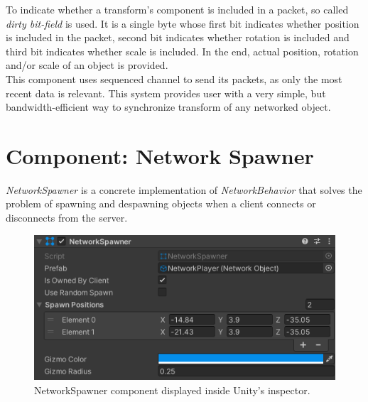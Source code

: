 \documentclass[times, utf8, diplomski]{fer}
\begin{document}
To indicate whether a transform's component is included in a packet, so called \textit{dirty bit-field} is used. It is a single byte whose first bit indicates whether position is included in the packet, second bit indicates whether rotation is included and third bit indicates whether scale is included. In the end, actual position, rotation and/or scale of an object is provided.\\

This component uses sequenced channel to send its packets, as only the most recent data is relevant. This system provides user with a very simple, but bandwidth-efficient way to synchronize transform of any networked object. 

\section{Component: Network Spawner}
\textit{NetworkSpawner} is a concrete implementation of \textit{NetworkBehavior} that solves the problem of spawning and despawning objects when a client connects or disconnects from the server.

\begin{figure}[H]
	\centering
	\includegraphics[scale=1.1]{NetworkSpawner-inspector}
	\caption{NetworkSpawner component displayed inside Unity's inspector.}
\end{figure}
\end{document}
